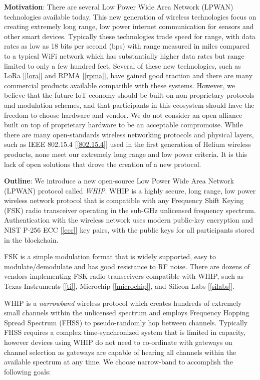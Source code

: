 \documentclass[letterpaper,11pt]{article}
\begin{document}
\textbf{Motivation}: There are several Low Power Wide Area Network (LPWAN) technologies available today. This new generation of wireless technologies focus on creating extremely long range, low power internet communication for sensors and other smart devices. Typically these technologies trade speed for range, with data rates as low as 18 bits per second (bps) with range measured in miles compared to a typical WiFi network which has substantially higher data rates but range limited to only a few hundred feet. Several of these new technologies, such as LoRa [\ref{lora}] and RPMA [\ref{rpma}], have gained good traction and there are many commercial products available compatible with these systems. However, we believe that the future IoT economy should be built on non-proprietary protocols and modulation schemes, and that participants in this ecosystem should have the freedom to choose hardware and vendor. We do not consider an open alliance built on top of proprietary hardware to be an acceptable compromoise. While there are many open-standards wireless networking protocols and physical layers, such as IEEE 802.15.4 [\ref{802.15.4}] used in the first generation of Helium wireless products, none meet our extremely long range and low power criteria. It is this lack of open solutions that drove the creation of a new protocol.\newline

\textbf{Outline}: We introduce a new open-source Low Power Wide Area Network (LPWAN) protocol called \textit{WHIP}. WHIP is a highly secure, long range, low power wireless network protocol that is compatible with any Frequency Shift Keying (FSK) radio transceiver operating in the sub-GHz unlicensed frequency spectrum. Authentication with the wireless network uses modern public-key encryption and NIST P-256 ECC [\ref{ecc}] key pairs, with the public keys for all participants stored in the blockchain.\newline 

FSK is a simple modulation format that is widely supported, easy to modulate/demodulate and has good resistance to RF noise. There are dozens of vendors implementing FSK radio transceivers compatible with WHIP, such as Texas Instruments [\ref{ti}], Microchip [\ref{microchip}], and Silicon Labs [\ref{silabs}]. \newline

WHIP is a \textit{narrowband} wireless protocol which creates hundreds of extremely small channels within the unlicensed spectrum and employs Frequency Hopping Spread Spectrum (FHSS) to pseudo-randomly hop between channels. Typically FHSS requires a complex time-synchronized system that is limited in capacity, however devices using WHIP do not need to co-ordinate with gateways on channel selection as gateways are capable of hearing all channels within the available spectrum at any time. We choose narrow-band to accomplish the following goals:
\end{document}
